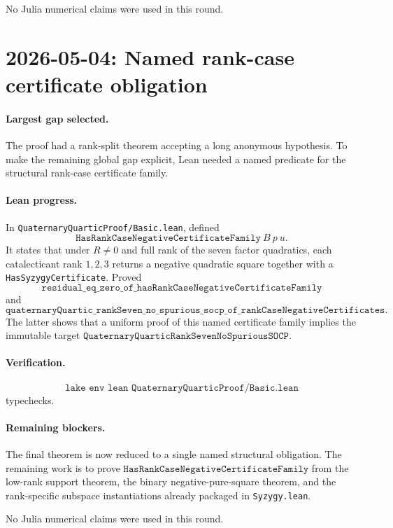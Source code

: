 \documentclass[11pt]{article}
\begin{document}
No Julia numerical claims were used in this round.

\section*{2026-05-04: Named rank-case certificate obligation}

\paragraph{Largest gap selected.}
The proof had a rank-split theorem accepting a long anonymous hypothesis.
To make the remaining global gap explicit, Lean needed a named predicate for
the structural rank-case certificate family.

\paragraph{Lean progress.}
In \texttt{QuaternaryQuarticProof/Basic.lean}, defined
\[
\texttt{HasRankCaseNegativeCertificateFamily}\ B\ p\ u.
\]
It states that under \(R\neq0\) and full rank of the seven factor quadratics,
each catalecticant rank \(1,2,3\) returns a negative quadratic square together
with a \texttt{HasSyzygyCertificate}.  Proved
\[
\texttt{residual\_eq\_zero\_of\_hasRankCaseNegativeCertificateFamily}
\]
and
\[
\texttt{quaternaryQuartic\_rankSeven\_no\_spurious\_socp\_of\_rankCaseNegativeCertificates}.
\]
The latter shows that a uniform proof of this named certificate family implies
the immutable target
\(\texttt{QuaternaryQuarticRankSevenNoSpuriousSOCP}\).

\paragraph{Verification.}
\[
\texttt{lake env lean QuaternaryQuarticProof/Basic.lean}
\]
typechecks.

\paragraph{Remaining blockers.}
The final theorem is now reduced to a single named structural obligation.
The remaining work is to prove \(\texttt{HasRankCaseNegativeCertificateFamily}\)
from the low-rank support theorem, the binary negative-pure-square theorem,
and the rank-specific subspace instantiations already packaged in
\texttt{Syzygy.lean}.

No Julia numerical claims were used in this round.
\end{document}
